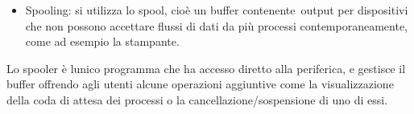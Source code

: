 \documentclass[
]{article}
\providecommand{\tightlist}{%
  \setlength{\itemsep}{0pt}\setlength{\parskip}{0pt}}
\begin{document}
{}

\begin{itemize}
\tightlist
\item
  {Spooling}{: si utilizza lo spool, cioè un buffer
  }{contenente}{~output per dispositivi che non possono accettare flussi
  di dati da più processi contemporaneamente, come ad esempio la
  stampante.}
\end{itemize}

{Lo spooler è l\textquotesingle unico programma che ha accesso diretto
alla periferica, e gestisce il buffer offrendo agli utenti alcune
operazioni aggiuntive come la visualizzazione della coda di attesa dei
processi o la cancellazione/sospensione di uno di essi.}

{}

{}

{}
\end{document}
